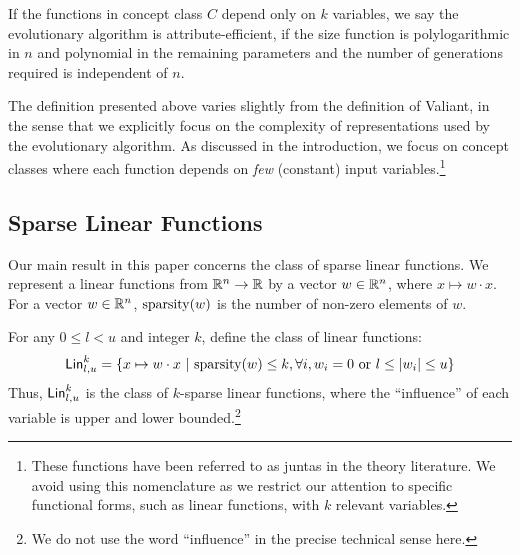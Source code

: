 \begin{remark} If the functions in concept class $C$ depend only on $k$
variables, we say the evolutionary algorithm is attribute-efficient, if the size
function is polylogarithmic in $n$ and polynomial in the remaining parameters
and the number of generations required is independent of $n$.
\end{remark}

The definition presented above varies slightly from the definition of Valiant,
in the sense that we explicitly focus on the complexity of representations used
by the evolutionary algorithm. As discussed in the introduction, we focus on
concept classes where each function depends on \emph{few} (constant) input
variables.\footnote{These functions have been referred to as juntas in the
theory literature. We avoid using this nomenclature as we restrict our attention
to specific functional forms, such as linear functions, with $k$ relevant
variables.} 


\subsection{Sparse Linear Functions} 
\label{sec:notation-class}

Our main result in this paper concerns the class of sparse linear functions.  We
represent a linear functions from $\mathbb{R}^n \rightarrow \mathbb{R}$ by a vector $w
\in \mathbb{R}^n$, where $x \mapsto w \cdot x$.  For a vector $w \in \mathbb{R}^n$,
$\mathrm{sparsity}(w)$ is the number of non-zero elements of $w$.

For any $0 \leq l < u$ and integer $k$, define the class of linear functions:
\[
\mathsf{Lin}^k_{l, u} = \{ x \mapsto w \cdot x ~|~ \mathrm{sparsity}(w) \leq k, \forall i,
w_i = 0 \mbox{ or } l \leq |w_i| \leq u \}
\]
Thus, $\mathsf{Lin}^k_{l, u}$ is the class of $k$-sparse linear functions, where the
``influence'' of each variable is upper and lower bounded.\footnote{We do not
use the word ``influence'' in the precise technical sense here.}

